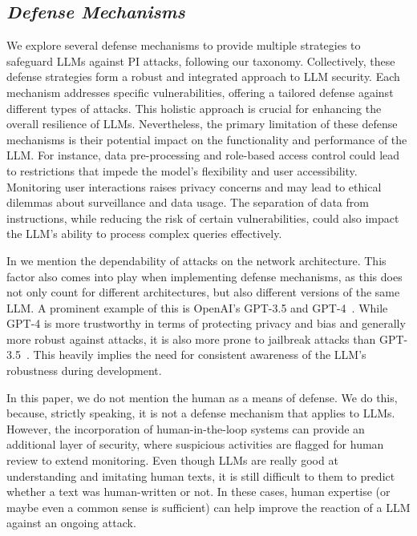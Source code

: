 \subsection{\textit{Defense Mechanisms}}
We explore several defense mechanisms to provide multiple strategies to safeguard LLMs against PI attacks, following our taxonomy. 
Collectively, these defense strategies form a robust and integrated approach to LLM security. Each mechanism addresses specific vulnerabilities, offering a tailored defense against different types of attacks. 
This holistic approach is crucial for enhancing the overall resilience of LLMs.
Nevertheless, the primary limitation of these defense mechanisms is their potential impact on the functionality and performance of the LLM. For instance, data pre-processing and role-based access control could lead to restrictions that impede the model's flexibility and user accessibility.
Monitoring user interactions raises privacy concerns and may lead to ethical dilemmas about surveillance and data usage. The separation of data from instructions, while reducing the risk of certain vulnerabilities, could also impact the LLM's ability to process complex queries effectively. 

In  we mention the dependability of attacks on the network architecture.
This factor also comes into play when implementing defense mechanisms, as this does not only count for different architectures, but also different versions of the same LLM. A prominent example of this is OpenAI's GPT-3.5 and GPT-4~\cite{wang2023decodingtrust}. While GPT-4 is more trustworthy in terms of protecting privacy and bias and generally more robust against attacks, it is also more prone to jailbreak attacks than GPT-3.5~\cite{wang2023decodingtrust}. This heavily implies the need for consistent awareness of the LLM's robustness during development.

In this paper, we do not mention the human as a means of defense. We do this, because, strictly speaking, it is not a defense mechanism that applies to LLMs. 
However, the incorporation of human-in-the-loop systems can provide an additional layer of security, where suspicious activities are flagged for human review to extend monitoring. 
Even though LLMs are really good at understanding and imitating human texts, it is still difficult to them to predict whether a text was human-written or not. In these cases, human expertise (or maybe even a common sense is sufficient) can help improve the reaction of a LLM against an ongoing attack.

